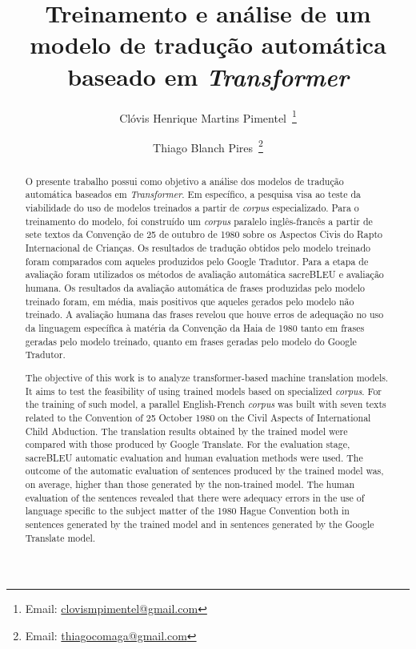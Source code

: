 \documentclass[portuguese]{textolivre}
\title{Treinamento e análise de um modelo de tradução automática baseado em \textit{Transformer}}
\author[1]{Clóvis Henrique Martins Pimentel~\orcid{0009-0008-7049-7688}\thanks{Email: \href{mailto:clovismpimentel@gmail.com}{clovismpimentel@gmail.com}}}
\author[1]{Thiago Blanch Pires~\orcid{0000-0002-0060-6075}\thanks{Email: \href{mailto:thiagocomaga@gmail.com}{thiagocomaga@gmail.com}}}
\affil[1]{Universidade de Brasília, Brasília, DF, Brasil.}
\begin{document}
\maketitle
\begin{polyabstract}
\begin{abstract}
O presente trabalho possui como objetivo a análise dos modelos de tradução automática baseados em \textit{Transformer}. Em específico, a pesquisa visa ao teste da viabilidade do uso de modelos treinados a partir de \textit{corpus} especializado. Para o treinamento do modelo, foi construído um \textit{corpus} paralelo inglês-francês a partir de sete textos da Convenção de 25 de outubro de 1980 sobre os Aspectos Civis do Rapto Internacional de Crianças. Os resultados de tradução obtidos pelo modelo treinado foram comparados com aqueles produzidos pelo Google Tradutor. Para a etapa de avaliação foram utilizados os métodos de avaliação automática sacreBLEU e avaliação humana. Os resultados da avaliação automática de frases produzidas pelo modelo treinado foram, em média, mais positivos que aqueles gerados pelo modelo não treinado. A avaliação humana das frases revelou que houve erros de adequação no uso da linguagem específica à matéria da Convenção da Haia de 1980 tanto em frases geradas pelo modelo treinado, quanto em frases geradas pelo modelo do Google Tradutor.

\end{abstract}

\begin{english}
\begin{abstract}
The objective of this work is to analyze transformer-based machine translation models. It aims to test the feasibility of using trained models based on specialized \textit{corpus}. For the training of such model, a parallel English-French \textit{corpus} was built with seven texts related to the Convention of 25 October 1980 on the Civil Aspects of International Child Abduction. The translation results obtained by the trained model were compared with those produced by Google Translate. For the evaluation stage, sacreBLEU automatic evaluation and human evaluation methods were used. The outcome of the automatic evaluation of sentences produced by the trained model was, on average, higher than those generated by the non-trained model. The human evaluation of the sentences revealed that there were adequacy errors in the use of language specific to the subject matter of the 1980 Hague Convention both in sentences generated by the trained model and in sentences generated by the Google Translate model.

\end{abstract}
\end{english}
\end{polyabstract}
\end{document}
